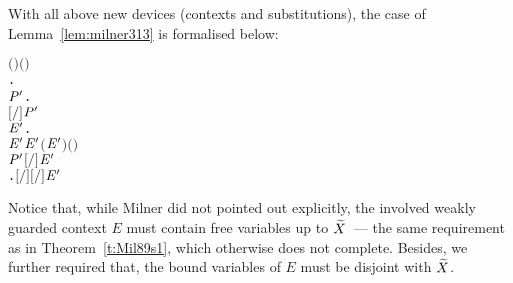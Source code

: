 With all above new devices (\multivariate contexts and substitutions),
the \multivariate case of Lemma~\ref{lem:milner313} is formalised
below:
\begin{alltt}
\HOLTokenTurnstile{}    \HOLSymConst{\HOLTokenConj{}}   \HOLSymConst{\HOLTokenSubset{}}   \HOLSymConst{\HOLTokenConj{}}  \ensuremath{(} \ensuremath{)} \ensuremath{(} \ensuremath{)} \HOLSymConst{\HOLTokenImp{}}
   \HOLSymConst{\HOLTokenForall{}}.
         \HOLSymConst{\ensuremath{=}}   \HOLSymConst{\HOLTokenImp{}}
       \HOLSymConst{\HOLTokenForall{}} \ensuremath{\HOLBoundVar{P}\sp{\prime}}.
           \ensuremath{[}\ensuremath{/}\ensuremath{]}  \HOLTokenTransBegin{}\HOLTokenTransEnd \ensuremath{\HOLBoundVar{P}\sp{\prime}} \HOLSymConst{\HOLTokenImp{}}
           \HOLSymConst{\HOLTokenExists{}}\ensuremath{\HOLBoundVar{E}\sp{\prime}}.
                 \ensuremath{\HOLBoundVar{E}\sp{\prime}} \HOLSymConst{\HOLTokenConj{}}  \ensuremath{\HOLBoundVar{E}\sp{\prime}} \HOLSymConst{\HOLTokenSubset{}}   \HOLSymConst{\HOLTokenConj{}}  \ensuremath{(} \ensuremath{\HOLBoundVar{E}\sp{\prime}}\ensuremath{)} \ensuremath{(} \ensuremath{)} \HOLSymConst{\HOLTokenConj{}}
               \ensuremath{\HOLBoundVar{P}\sp{\prime}} \HOLSymConst{\ensuremath{=}} \ensuremath{[}\ensuremath{/}\ensuremath{]} \ensuremath{\HOLBoundVar{E}\sp{\prime}} \HOLSymConst{\HOLTokenConj{}}
               \HOLSymConst{\HOLTokenForall{}}.   \HOLSymConst{\ensuremath{=}}   \HOLSymConst{\HOLTokenImp{}} \ensuremath{[}\ensuremath{/}\ensuremath{]}  \HOLTokenTransBegin{}\HOLTokenTransEnd \ensuremath{[}\ensuremath{/}\ensuremath{]} \ensuremath{\HOLBoundVar{E}\sp{\prime}}
\end{alltt}
Notice that, while Milner did not pointed out explicitly, the involved
weakly guarded context $E$ must contain free variables up to $\widetilde
X$~--- the same requirement as in Theorem~\ref{t:Mil89s1}, which
otherwise does not complete. Besides, we further required that, the
bound variables of $E$ must be disjoint with $\widetilde X$.


